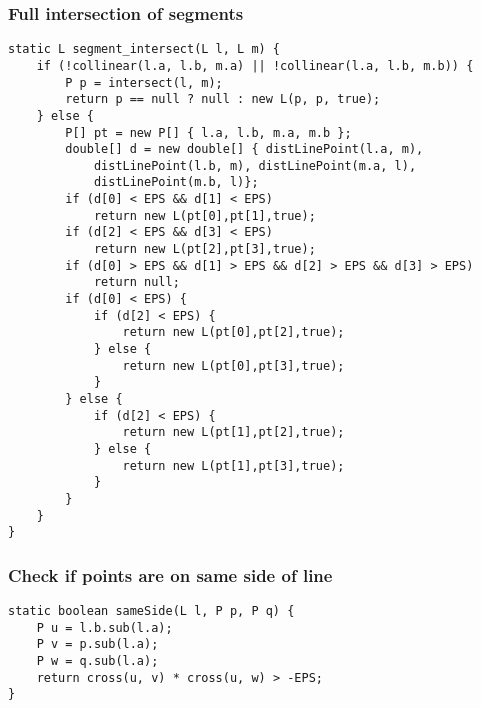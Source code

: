 \subsubsection{Full intersection of segments}
\begin{verbatim}
static L segment_intersect(L l, L m) {
	if (!collinear(l.a, l.b, m.a) || !collinear(l.a, l.b, m.b)) {
		P p = intersect(l, m);
		return p == null ? null : new L(p, p, true);
	} else {
		P[] pt = new P[] { l.a, l.b, m.a, m.b };
		double[] d = new double[] { distLinePoint(l.a, m),
			distLinePoint(l.b, m), distLinePoint(m.a, l),
			distLinePoint(m.b, l)};
		if (d[0] < EPS && d[1] < EPS) 
			return new L(pt[0],pt[1],true);
		if (d[2] < EPS && d[3] < EPS) 
			return new L(pt[2],pt[3],true);
		if (d[0] > EPS && d[1] > EPS && d[2] > EPS && d[3] > EPS) 
			return null;
		if (d[0] < EPS) {
			if (d[2] < EPS) {
				return new L(pt[0],pt[2],true);
			} else {
				return new L(pt[0],pt[3],true);
			}
		} else {
			if (d[2] < EPS) {
				return new L(pt[1],pt[2],true);
			} else {
				return new L(pt[1],pt[3],true);
			}
		}
	}
}
\end{verbatim}
\subsubsection{Check if points are on same side of line}
\begin{verbatim}
static boolean sameSide(L l, P p, P q) {
	P u = l.b.sub(l.a);
	P v = p.sub(l.a);
	P w = q.sub(l.a);
	return cross(u, v) * cross(u, w) > -EPS;
}
\end{verbatim}